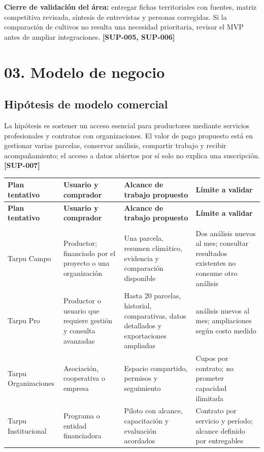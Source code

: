 \documentclass[10pt,a4paper]{article}
\begin{document}
\textbf{Cierre de validación del área:} entregar fichas territoriales con fuentes, matriz competitiva revisada, síntesis de entrevistas y personas corregidas. Si la comparación de cultivos no resulta una necesidad prioritaria, revisar el MVP antes de ampliar integraciones. \textbf{[SUP-005, SUP-006]}


\clearpage\section{03. Modelo de negocio}\label{03-modelo-de-negocio}

\subsection{Hipótesis de modelo comercial}

La hipótesis es sostener un acceso esencial para productores mediante servicios profesionales y contratos con organizaciones. El valor de pago propuesto está en gestionar varias parcelas, conservar análisis, compartir trabajo y recibir acompañamiento; el acceso a datos abiertos por sí solo no explica una suscripción. \textbf{[SUP-007]}


\begingroup\small
\begin{longtable}{>{\raggedright\arraybackslash}p{3.115cm}>{\raggedright\arraybackslash}p{3.582cm}>{\raggedright\arraybackslash}p{4.517cm}>{\raggedright\arraybackslash}p{4.361cm}}
\toprule
\textbf{Plan tentativo} & \textbf{Usuario y comprador} & \textbf{Alcance de trabajo propuesto} & \textbf{Límite a validar} \\
\midrule\endfirsthead
\toprule
\textbf{Plan tentativo} & \textbf{Usuario y comprador} & \textbf{Alcance de trabajo propuesto} & \textbf{Límite a validar} \\
\midrule\endhead
\midrule\multicolumn{4}{r}{\scriptsize Continúa en la página siguiente}\\\endfoot
\bottomrule\endlastfoot
Tarpu Campo & Productor; financiado por el proyecto o una organización & Una parcela, resumen climático, evidencia y comparación disponible & Dos análisis nuevos al mes; consultar resultados existentes no consume otro análisis \\[3pt]
Tarpu Pro & Productor o usuario que requiere gestión y consulta avanzadas & Hasta 20 parcelas, historial, comparativas, datos detallados y exportaciones ampliadas & 40 análisis nuevos al mes; ampliaciones según costo medido \\[3pt]
Tarpu Organizaciones & Asociación, cooperativa o empresa & Espacio compartido, permisos y seguimiento & Cupos por contrato; no prometer capacidad ilimitada \\[3pt]
Tarpu Institucional & Programa o entidad financiadora & Piloto con alcance, capacitación y evaluación acordados & Contrato por servicio y período; alcance definido por entregables \\[3pt]
\end{longtable}
\endgroup
\end{document}
